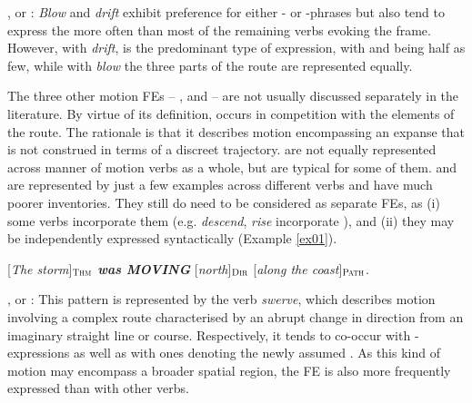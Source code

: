 \documentclass[output=paper,colorlinks,citecolor=brown]{langscibook}
\begin{document}
,  or : \textit{Blow} and \textit{drift} %
exhibit preference for either - or -phrases but also tend to express the  more often than most of the remaining verbs evoking the  frame. However, with \textit{drift},  is the predominant type of expression, with  and  being half as few, while with \textit{blow} the three parts of the route are represented equally. 

The three other motion FEs -- ,  and  -- are not usually discussed separately in the literature. By virtue of its definition,  occurs in competition with the elements of the route. The rationale is that it describes motion encompassing an expanse that is not construed in terms of a discreet trajectory.  are not equally represented across manner of motion verbs as a whole, but are typical for some of them.  and  are represented by just a few examples across different verbs and have much poorer inventories. They still do need to be considered as separate FEs, as (i) some verbs incorporate them (e.g. \textit{descend}, \textit{rise} incorporate ), and (ii) they may be independently expressed syntactically (Example \ref{ex01}). 



\begin{exe}
\ex  \label{ex01}
[\textit{The storm}]$_{\text{\textsc{Thm}}}$ \textit{\textbf{was MOVING}} [\textit{north}]$_{\text{\textsc{Dir}}}$ [\textit{along the coast}]$_{\text{\textsc{Path}}}$.
\end{exe}

,  or : This pattern is represented by the verb \textit{swerve}, which describes motion involving a complex route characterised by an abrupt change in direction from an imaginary straight line or course. Respectively, it tends to co-occur with -expressions as well as with ones denoting the newly assumed . As this kind of motion may encompass a broader spatial region, the FE  is also more frequently expressed than with other verbs. 
\end{document}
